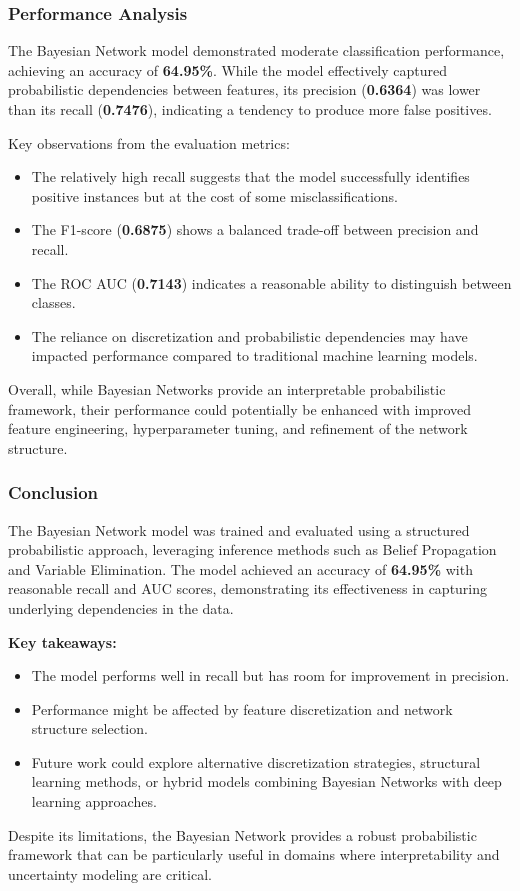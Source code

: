 \subsubsection{Performance Analysis}

The Bayesian Network model demonstrated moderate classification performance, achieving an accuracy of \textbf{64.95\%}. While the model effectively captured probabilistic dependencies between features, its precision (\textbf{0.6364}) was lower than its recall (\textbf{0.7476}), indicating a tendency to produce more false positives.

Key observations from the evaluation metrics:
\begin{itemize}
    \item The relatively high recall suggests that the model successfully identifies positive instances but at the cost of some misclassifications.
    \item The F1-score (\textbf{0.6875}) shows a balanced trade-off between precision and recall.
    \item The ROC AUC (\textbf{0.7143}) indicates a reasonable ability to distinguish between classes.
    \item The reliance on discretization and probabilistic dependencies may have impacted performance compared to traditional machine learning models.
\end{itemize}

Overall, while Bayesian Networks provide an interpretable probabilistic framework, their performance could potentially be enhanced with improved feature engineering, hyperparameter tuning, and refinement of the network structure.

\subsubsection{Conclusion}

The Bayesian Network model was trained and evaluated using a structured probabilistic approach, leveraging inference methods such as Belief Propagation and Variable Elimination. The model achieved an accuracy of \textbf{64.95\%} with reasonable recall and AUC scores, demonstrating its effectiveness in capturing underlying dependencies in the data.

\textbf{Key takeaways:}
\begin{itemize}
    \item The model performs well in recall but has room for improvement in precision.
    \item Performance might be affected by feature discretization and network structure selection.
    \item Future work could explore alternative discretization strategies, structural learning methods, or hybrid models combining Bayesian Networks with deep learning approaches.
\end{itemize}

Despite its limitations, the Bayesian Network provides a robust probabilistic framework that can be particularly useful in domains where interpretability and uncertainty modeling are critical.

